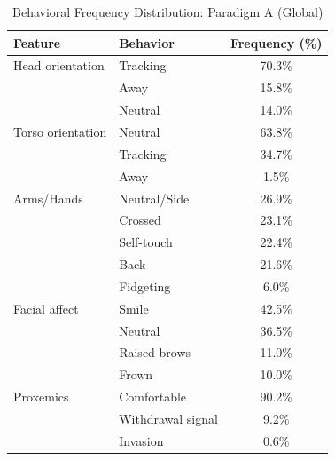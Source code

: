 \begin{table}[ht]
\centering
\caption{Behavioral Frequency Distribution: Paradigm A (Global)}
\begin{tabular}{llc}
\toprule
Feature & Behavior & Frequency (\%) \\
\midrule
Head orientation & Tracking & 70.3\% \\
 & Away & 15.8\% \\
 & Neutral & 14.0\% \\
Torso orientation & Neutral & 63.8\% \\
 & Tracking & 34.7\% \\
 & Away & 1.5\% \\
Arms/Hands & Neutral/Side & 26.9\% \\
 & Crossed & 23.1\% \\
 & Self-touch & 22.4\% \\
 & Back & 21.6\% \\
 & Fidgeting & 6.0\% \\
Facial affect & Smile & 42.5\% \\
 & Neutral & 36.5\% \\
 & Raised brows & 11.0\% \\
 & Frown & 10.0\% \\
Proxemics & Comfortable & 90.2\% \\
 & Withdrawal signal & 9.2\% \\
 & Invasion & 0.6\% \\
\bottomrule
\end{tabular}
\end{table}